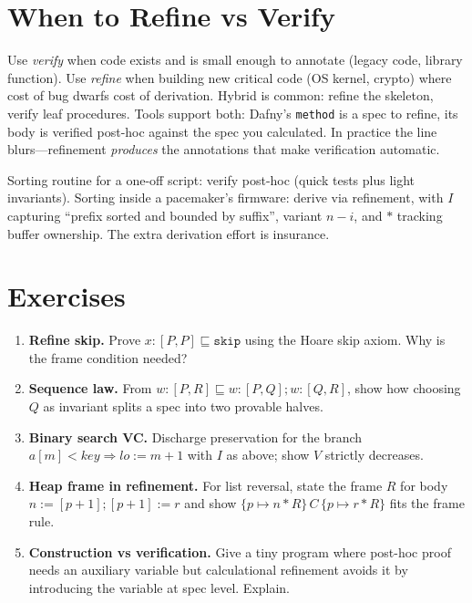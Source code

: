\section{When to Refine vs Verify}
\label{sec:when}
Use \emph{verify} when code exists and is small enough to annotate (legacy code, library function). Use \emph{refine} when building new critical code (OS kernel, crypto) where cost of bug dwarfs cost of derivation. Hybrid is common: refine the skeleton, verify leaf procedures. Tools support both: Dafny's \texttt{method} is a spec to refine, its body is verified post-hoc against the spec you calculated. In practice the line blurs—refinement \emph{produces} the annotations that make verification automatic.

\begin{example}[Choosing]
Sorting routine for a one-off script: verify post-hoc (quick tests plus light invariants). Sorting inside a pacemaker's firmware: derive via refinement, with $I$ capturing ``prefix sorted and bounded by suffix'', variant $n-i$, and $*$ tracking buffer ownership. The extra derivation effort is insurance.
\end{example}

\section{Exercises}
\label{sec:ch08-exercises}
\begin{enumerate}[label=E8.\arabic*, leftmargin=*, itemsep=0.6em]
    \item \textbf{Refine skip.} Prove $x:[P,P]\sqsubseteq\texttt{skip}$ using the Hoare skip axiom. Why is the frame condition needed?
    \item \textbf{Sequence law.} From $w:[P,R]\sqsubseteq w:[P,Q];w:[Q,R]$, show how choosing $Q$ as invariant splits a spec into two provable halves.
    \item \textbf{Binary search VC.} Discharge preservation for the branch $a[m]<key\Rightarrow lo:=m+1$ with $I$ as above; show $V$ strictly decreases.
    \item \textbf{Heap frame in refinement.} For list reversal, state the frame $R$ for body $n:=[p+1];[p+1]:=r$ and show $\{p\mapsto n * R\}\,C\,\{p\mapsto r * R\}$ fits the frame rule.
    \item \textbf{Construction vs verification.} Give a tiny program where post-hoc proof needs an auxiliary variable but calculational refinement avoids it by introducing the variable at spec level. Explain.
\end{enumerate}

